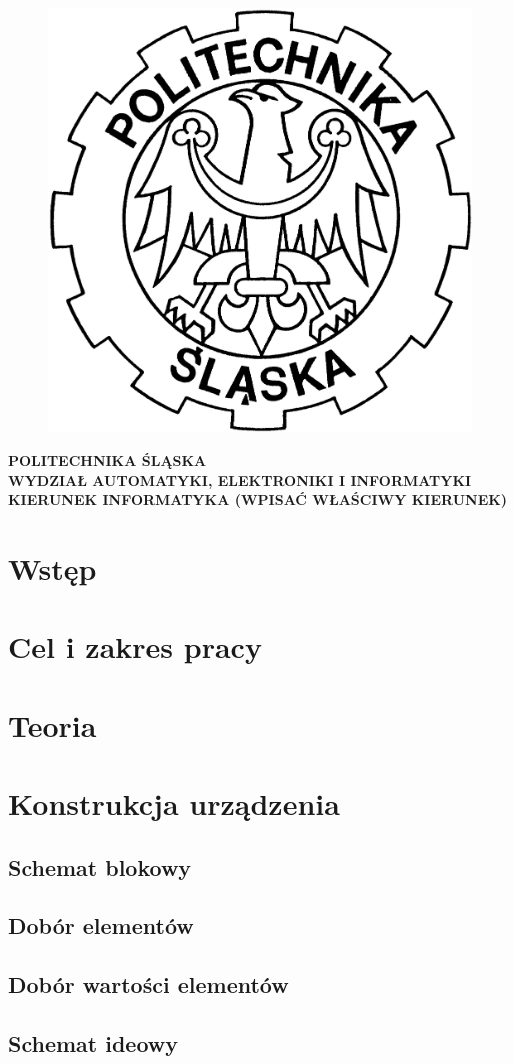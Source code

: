 \documentclass[12pt]{report}
\begin{document}
\hspace{2 cm}%
\begin{figure}[!t]
\centering
\includegraphics[width=2.5 cm, height=2.5 cm]{Obrazy/godlo_polibudy} 
\end{figure}
\begin{center}
\textbf{POLITECHNIKA ŚLĄSKA\\
WYDZIAŁ AUTOMATYKI, ELEKTRONIKI I INFORMATYKI\\
KIERUNEK INFORMATYKA (WPISAĆ WŁAŚCIWY KIERUNEK)}

\end{center}


\tableofcontents	%

\chapter{Wstęp} \label{rozdz.wstep} 


\chapter{Cel i zakres pracy} \label{etykietarozdzialu2}


\chapter{Teoria}


\chapter{Konstrukcja urządzenia}
\section{Schemat blokowy}
\section{Dobór elementów}
\section{Dobór wartości elementów}
\section{Schemat ideowy}
\end{document}
